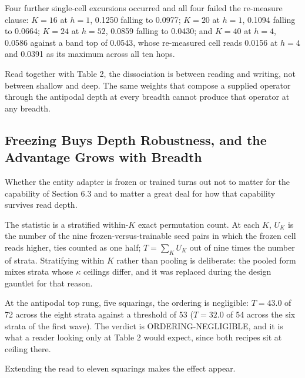 Four further single-cell excursions occurred and all four failed the
re-measure clause: $K{=}16$ at $h{=}1$, 0.1250 falling to 0.0977;
$K{=}20$ at $h{=}1$, 0.1094 falling to 0.0664; $K{=}24$ at $h{=}52$,
0.0859 falling to 0.0430; and $K{=}40$ at $h{=}4$, 0.0586 against a band
top of 0.0543, whose re-measured cell reads 0.0156 at $h{=}4$ and 0.0391
as its maximum across all ten hops.

Read together with Table 2, the dissociation is between reading and
writing, not between shallow and deep. The same weights that compose a
supplied operator through the antipodal depth at every breadth cannot
produce that operator at any breadth.

\subsection{Freezing Buys Depth Robustness, and the Advantage Grows with Breadth}

Whether the entity adapter is frozen or trained turns out not to matter
for the capability of Section 6.3 and to matter a great deal for how
that capability survives read depth.

The statistic is a stratified within-$K$ exact permutation count. At
each $K$, $U_K$ is the number of the nine frozen-versus-trainable seed
pairs in which the frozen cell reads higher, ties counted as one half;
$T = \sum_K U_K$ out of nine times the number of strata. Stratifying
within $K$ rather than pooling is deliberate: the pooled form mixes
strata whose $\kappa$ ceilings differ, and it was replaced during the
design gauntlet for that reason.

At the antipodal top rung, five squarings, the ordering is negligible:
$T = 43.0$ of 72 across the eight strata against a threshold of 53
($T = 32.0$ of 54 across the six strata of the first wave). The verdict
is ORDERING-NEGLIGIBLE, and it is what a reader looking only at Table 2
would expect, since both recipes sit at ceiling there.

Extending the read to eleven squarings makes the effect appear.

